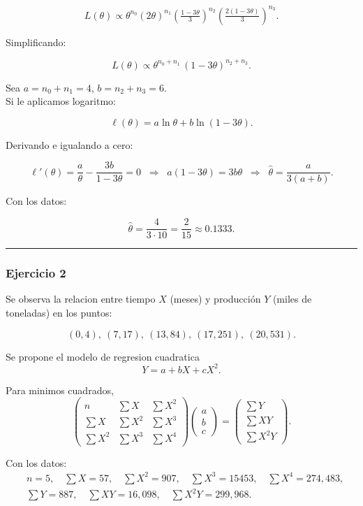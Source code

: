 \documentclass[11pt]{article}
\begin{document}
\[
L(\theta)\propto 
\theta^{n_0}(2\theta)^{n_1}\left(\tfrac{1-3\theta}{3}\right)^{n_2}
\left(\tfrac{2(1-3\theta)}{3}\right)^{n_3}.
\]

Simplificando:

\[
L(\theta) \propto \theta^{n_0+n_1}\,(1-3\theta)^{n_2+n_3}.
\]

Sea \(a=n_0+n_1=4\), \(b=n_2+n_3=6\).\\
Si le aplicamos logaritmo:

\[
\ell(\theta) = a\ln\theta + b\ln(1-3\theta).
\]

Derivando e igualando a cero:

\[
\ell'(\theta) = \frac{a}{\theta} - \frac{3b}{1-3\theta} = 0
\;\;\Rightarrow\;\;
a(1-3\theta)=3b\theta
\;\;\Rightarrow\;\;
\hat{\theta} = \frac{a}{3(a+b)}.
\]

Con los datos:

\[
\boxed{
\hat{\theta} = \frac{4}{3\cdot 10} = \frac{2}{15} \approx 0.1333.}
\]

    \begin{center}\rule{0.5\linewidth}{0.5pt}\end{center}

\subsubsection{Ejercicio 2}\label{ejercicio-2}

Se observa la relacion entre tiempo \(X\) (meses) y producción \(Y\)
(miles de toneladas) en los puntos:

\[
(0,4),\ (7,17),\ (13,84),\ (17,251),\ (20,531).
\]

Se propone el modelo de regresion cuadratica \[
Y = a + bX + cX^2.
\]

Para minimos cuadrados, \[
\begin{pmatrix}
n & \sum X & \sum X^2\\
\sum X & \sum X^2 & \sum X^3\\
\sum X^2 & \sum X^3 & \sum X^4
\end{pmatrix}
\begin{pmatrix} a\\ b\\ c \end{pmatrix}
=
\begin{pmatrix}
\sum Y\\ \sum XY\\ \sum X^2Y
\end{pmatrix}.
\]

Con los datos: \[
\begin{aligned}
&n=5,\quad \sum X = 57,\quad \sum X^2 = 907,\quad \sum X^3 = 15453,\quad \sum X^4 = 274{,}483,\\
&\sum Y = 887,\quad \sum XY = 16{,}098,\quad \sum X^2Y = 299{,}968.
\end{aligned}
\]
\end{document}
